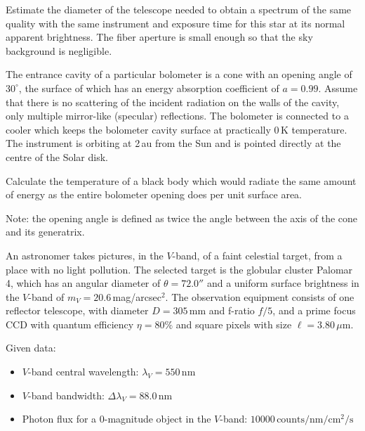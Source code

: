 Estimate the diameter of the telescope needed to obtain a spectrum of the
same quality with the same instrument and exposure time for this star at its
normal apparent brightness. The fiber aperture is small enough so that the
sky background is negligible.

The entrance cavity of a particular bolometer is a cone with an opening angle
of $30^\circ$, the surface of which has an energy absorption coefficient of
$a = 0.99$. Assume that there is no scattering of the incident radiation on
the walls of the cavity, only multiple mirror-like (specular) reflections.
The bolometer is connected to a cooler which keeps the bolometer cavity
surface at practically 0\,K temperature. The instrument is orbiting at 2\,au
from the Sun and is pointed directly at the centre of the Solar disk.

Calculate the temperature of a black body which would radiate the same
amount of energy as the entire bolometer opening does per unit surface area.

Note: the opening angle is defined as twice the angle between the axis of
the cone and its generatrix.

An astronomer takes pictures, in the $V$-band, of a faint celestial target,
from a place with no light pollution. The selected target is the globular
cluster Palomar 4, which has an angular diameter of $\theta = 72.0''$ and a
uniform surface brightness in the $V$-band of $m_V = 20.6$\,mag/arcsec$^2$.
The observation equipment consists of one reflector telescope, with diameter
$D = 305$\,mm and f-ratio $f/5$, and a prime focus CCD with quantum
efficiency $\eta = 80\%$ and square pixels with size $\ell = 3.80\,\mu$m.

Given data:
\begin{itemize}
\item $V$-band central wavelength: $\lambda_V = 550$\,nm
\item $V$-band bandwidth: $\Delta\lambda_V = 88.0$\,nm
\item Photon flux for a 0-magnitude object in the $V$-band:
  $10000\,\mathrm{counts/nm/cm^2/s}$
\end{itemize}

